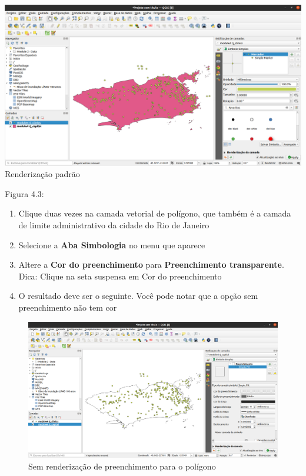 \documentclass[
]{book}
\providecommand{\tightlist}{%
  \setlength{\itemsep}{0pt}\setlength{\parskip}{0pt}}
\begin{document}
\includegraphics{media/modulo4/default-vector-render.png}Renderização padrão

Figura 4.3:

\begin{enumerate}
\def\labelenumi{\arabic{enumi}.}
\setcounter{enumi}{3}
\tightlist
\item
  Clique duas vezes na camada vetorial de polígono, que também é a camada de limite administrativo da cidade do Rio de Janeiro
\item
  Selecione a \textbf{Aba Simbologia} no menu que aparece
\item
  Altere a \textbf{Cor do preenchimento} para \textbf{Preenchimento transparente}. Dica: Clique na seta suspensa em Cor do preenchimento
\item
  O resultado deve ser o seguinte. Você pode notar que a opção sem preenchimento não tem cor
\end{enumerate}

\begin{figure}
\centering
\includegraphics{media/modulo4/no-fill-render.png}
\caption{Sem renderização de preenchimento para o polígono}
\end{figure}
\end{document}
